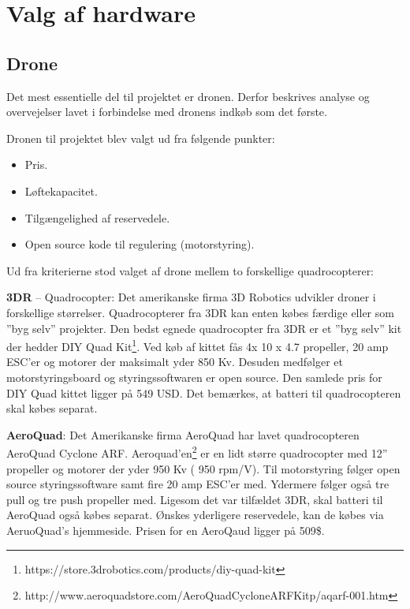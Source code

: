 \chapter{Valg af hardware}

\section{Drone}

Det mest essentielle del til projektet er dronen. Derfor beskrives analyse og overvejelser lavet i forbindelse med dronens indkøb som det første.
  
Dronen til projektet blev valgt ud fra følgende punkter:
\begin{itemize}
	\item Pris.
	\item Løftekapacitet. 
	\item Tilgængelighed af reservedele. 
	\item Open source kode til regulering (motorstyring).
\end{itemize}

\vspace{0.5cm}

Ud fra kriterierne stod valget af drone mellem to forskellige quadrocopterer: 

\textbf{3DR} – Quadrocopter:  Det amerikanske firma 3D Robotics udvikler droner i forskellige størrelser. Quadrocopterer fra 3DR kan enten købes færdige eller som ”byg selv” projekter. Den bedst egnede quadrocopter fra 3DR er et ”byg selv” kit der hedder DIY Quad Kit\footnote{https://store.3drobotics.com/products/diy-quad-kit}. Ved køb af kittet fås 4x 10 x 4.7 propeller, 20 amp ESC’er og motorer der maksimalt yder 850 Kv.  Desuden medfølger et motorstyringsboard og styringssoftwaren er open source. Den samlede pris for DIY Quad kittet ligger på 549 USD. Det bemærkes, at batteri til quadrocopteren skal købes separat.

\textbf{AeroQuad}: Det Amerikanske firma AeroQuad har lavet quadrocopteren AeroQuad Cyclone ARF. Aeroquad'en\footnote{http://www.aeroquadstore.com/AeroQuad\textunderscore Cyclone\textunderscore ARF\textunderscore Kit\textunderscore p/aqarf-001.htm} er en lidt større quadrocopter med 12” propeller og motorer der yder 950 Kv ( 950 rpm/V). Til motorstyring følger open source styringssoftware samt fire 20 amp ESC'er med. Ydermere følger også tre pull og tre push propeller med. \newline Ligesom det var tilfældet 3DR, skal batteri til AeroQuad også købes separat. Ønskes yderligere reservedele, kan de købes via AeruoQuad’s hjemmeside. Prisen for en AeroQaud ligger på 509\$.

